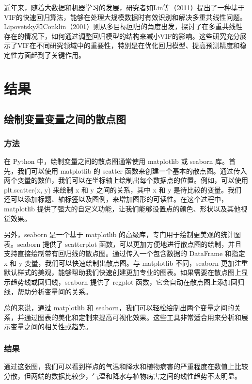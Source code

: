 \documentclass[AutoFakeBold]{LZUThesis-PgD&PhD}
\begin{document}
	近年来，随着大数据和机器学习的发展，研究者如Lin等（2011）提出了一种基于VIF的快速回归算法，能够在处理大规模数据时有效识别和解决多重共线性问题\cite{lin2011}。Lipovetsky和Conklin（2001）则从多目标回归的角度出发，探讨了在多重共线性存在的情况下，如何通过调整回归模型的结构来减小VIF的影响\cite{lipovetsky2001}。这些研究充分展示了VIF在不同研究领域中的重要性，特别是在优化回归模型、提高预测精度和稳定性方面起到了关键作用。
	

\chapter{结果}

\section{绘制变量变量之间的散点图}
	
	
\subsection{方法}

在 Python 中，绘制变量之间的散点图通常使用 matplotlib 或 seaborn 库。首先，我们可以使用 matplotlib 的 scatter 函数来创建一个基本的散点图。通过传入两个变量的数值，我们可以在坐标轴上绘制出每个数据点的位置。例如，可以使用 plt.scatter(x, y) 来绘制 x 和 y 之间的关系，其中 x 和 y 是待比较的变量。我们还可以添加标题、轴标签以及图例，来增加图形的可读性。在这个过程中，matplotlib 提供了强大的自定义功能，让我们能够设置点的颜色、形状以及其他视觉效果。

另外，seaborn 是一个基于 matplotlib 的高级库，专门用于绘制更美观的统计图表。seaborn 提供了 scatterplot 函数，可以更加方便地进行散点图的绘制，并且支持直接绘制带有回归线的散点图。通过传入一个包含数据的 DataFrame 和指定 x 和 y 变量，我们可以快速绘制出散点图。与 matplotlib 不同，seaborn 更加注重默认样式的美观，能够帮助我们快速创建更加专业的图表。如果需要在散点图上显示趋势线或回归线，seaborn 提供了 regplot 函数，它会自动在散点图上添加回归线，帮助分析变量间的关系。

总的来说，通过 matplotlib 和 seaborn，我们可以轻松绘制出两个变量之间的关系，并通过图表的美化和定制来提高可视化效果。这些工具非常适合用来分析和展示变量之间的相关性或趋势。

\subsection{结果}

通过这张图，我们可以看到样点的气温和降水和植物病害的严重程度在数值上比较分散，但两端的数据比较少，气温和降水与植物病害之间的线性趋势不太明显。
\end{document}
